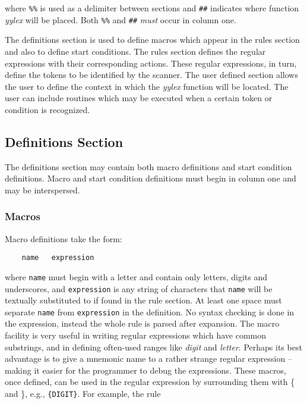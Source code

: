 where \verb|%%| is used as a delimiter between sections  and \verb|##| 
indicates where function {\sl yylex} will be placed.  Both \verb|%%| 
and \verb|##| {\it must} occur in column one.

\mysk
The definitions section is used to define macros which appear in the rules 
section and also to define start conditions.  The rules section defines the 
regular expressions with their corresponding actions.  These regular 
expressions, in turn, define the tokens to be identified by the scanner.
The user defined section allows the user to define the context in which the 
{\sl yylex} function will be located.  The user can include routines which
may be executed when a certain token or condition is recognized.  


\subsection{Definitions Section}

The definitions section may contain both macro definitions and
start condition definitions.  Macro and start condition definitions
must begin in column one and may be interspersed.

\subsubsection{Macros}
Macro definitions take the form:

\small
\begin{verbatim}
    name   expression
\end{verbatim}
\normalsize

where {\tt name} must begin with a letter and contain only letters,
digits and underscores, and {\tt expression} is
any string of characters that {\tt name} will be textually substituted to 
if found in the rule section.  At least one space must separate {\tt name} 
from {\tt expression} in the definition.  No syntax checking is done in 
the expression, instead the whole rule is parsed after expansion.
The macro facility is very useful in writing regular expressions which
have common substrings, and in defining often-used ranges like {\it digit} 
and {\it letter}.
Perhaps its best advantage is to give a mnemonic name to a rather strange
regular expression -- making it easier for the programmer to debug the
expressions.  These macros, once defined, can be used in the
regular expression by surrounding them with \{ and \}, e.g., \verb|{DIGIT}|.
For example, the rule

